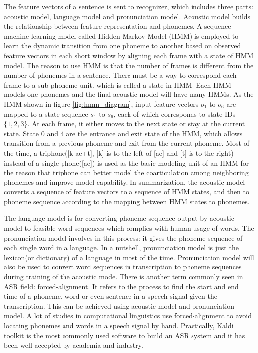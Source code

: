  The feature vectors of a sentence is sent to recognizer, which includes three parts: acoustic model, language model and pronunciation model. Acoustic model builds the relationship between feature representation and phonemes. A sequence machine learning model called Hidden Markov Model (HMM) is employed to learn the dynamic transition from one phoneme to another based on observed feature vectors in each short window by aligning each frame with a state of HMM model. The reason to use HMM is that the number of frames is different from the number of phonemes in a sentence. There must be a way to correspond each frame to a sub-phoneme unit, which is called a state in HMM. Each HMM models one phonemes and the final acoustic model will have many HMMs. As the HMM shown in figure \ref{fig:hmm_diagram}, input feature vectors $o_1$ to $o_6$ are mapped to a state sequence $s_1$ to $s_6$, each of which corresponds to state IDs $\{1,2,3\}$. At each frame, it either moves to the next state or stay at the current state. State 0 and 4 are the entrance and exit state of the HMM, which allows transition from a previous phoneme and exit from the current phoneme. Most of the time, a triphone([k-ae+t], [k] is to the left of [ae] and [t] is to the right) instead of a single phone([ae]) is used as the basic modeling unit of an HMM for the reason that triphone can better model the coarticulation among neighboring phonemes and improve model capability. In summarization, the acoustic model converts a sequence of feature vectors to a sequence of HMM states, and then to phoneme sequence according to the mapping between HMM states to phonemes.

 The language model is for converting phoneme sequence output by acoustic model to feasible word sequences which complies with human usage of words. The pronunciation model involves in this process: it gives the phoneme sequence of each single word in a language. In a nutshell, pronunciation model is just the lexicon(or dictionary) of a language in most of the time. Pronunciation model will also be used to convert word sequences in transcription to phoneme sequences during training of the acoustic mode. There is another term commonly seen in ASR field: forced-alignment. It refers to the process to find the start and end time of a phoneme, word or even sentence in a speech signal given the transcription. This can be achieved using acoustic model and pronunciation model. A lot of studies in computational linguistics use forced-alignment to avoid locating phonemes and words in a speech signal by hand. Practically, Kaldi toolkit \citep{povey2011kaldi} is the most commonly used software to build an ASR system and it has been well accepted by academia and industry.

